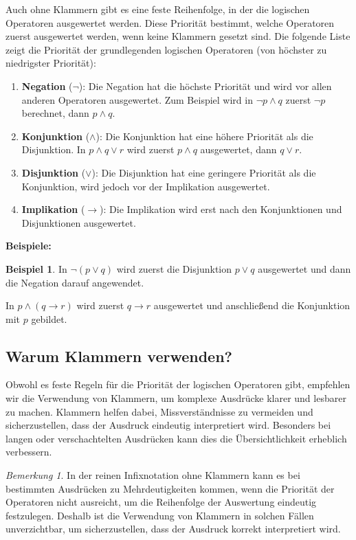 \documentclass{book}
\theoremstyle{plain}
\theoremstyle{remark}
\newtheorem*{remark}{Bemerkung}
\theoremstyle{definition}
\newtheorem*{example}{Beispiel}
\begin{document}
Auch ohne Klammern gibt es eine feste Reihenfolge, in der die logischen Operatoren ausgewertet werden. Diese Priorität bestimmt, welche Operatoren zuerst ausgewertet werden, wenn keine Klammern gesetzt sind. Die folgende Liste zeigt die Priorität der grundlegenden logischen Operatoren (von höchster zu niedrigster Priorität):

\begin{enumerate}
    \item \textbf{Negation} (\(\neg\)): Die Negation hat die höchste Priorität und wird vor allen anderen Operatoren ausgewertet. Zum Beispiel wird in \(\neg p \land q\) zuerst \(\neg p\) berechnet, dann \(p \land q\).
    \item \textbf{Konjunktion} (\(\land\)): Die Konjunktion hat eine höhere Priorität als die Disjunktion. In \(p \land q \lor r\) wird zuerst \(p \land q\) ausgewertet, dann \(q \lor r\).
    \item \textbf{Disjunktion} (\(\lor\)): Die Disjunktion hat eine geringere Priorität als die Konjunktion, wird jedoch vor der Implikation ausgewertet.
    \item \textbf{Implikation} (\(\rightarrow\)): Die Implikation wird erst nach den Konjunktionen und Disjunktionen ausgewertet.
\end{enumerate}

\textbf{Beispiele:}
\begin{example}
    \item In \(\neg (p \lor q)\) wird zuerst die Disjunktion \(p \lor q\) ausgewertet und dann die Negation darauf angewendet.
    \item In \(p \land (q \rightarrow r)\) wird zuerst \(q \rightarrow r\) ausgewertet und anschließend die Konjunktion mit \(p\) gebildet.
\end{example}

\subsection{Warum Klammern verwenden?}

Obwohl es feste Regeln für die Priorität der logischen Operatoren gibt, empfehlen wir die Verwendung von Klammern, um komplexe Ausdrücke klarer und lesbarer zu machen. Klammern helfen dabei, Missverständnisse zu vermeiden und sicherzustellen, dass der Ausdruck eindeutig interpretiert wird. Besonders bei langen oder verschachtelten Ausdrücken kann dies die Übersichtlichkeit erheblich verbessern.

\begin{remark}
In der reinen Infixnotation ohne Klammern kann es bei bestimmten Ausdrücken zu Mehrdeutigkeiten kommen, wenn die Priorität der Operatoren nicht ausreicht, um die Reihenfolge der Auswertung eindeutig festzulegen. Deshalb ist die Verwendung von Klammern in solchen Fällen unverzichtbar, um sicherzustellen, dass der Ausdruck korrekt interpretiert wird.
\end{remark}
\end{document}
